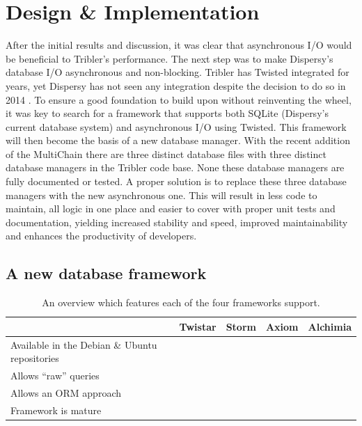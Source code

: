 \chapter{Design \& Implementation}

After the initial results and discussion, it was clear that asynchronous I/O would be beneficial to Tribler's performance.
The next step was to make Dispersy's database I/O asynchronous and non-blocking.
Tribler has Twisted integrated for years, yet Dispersy has not seen any integration despite the decision to do so in 2014 \cite{pouwelse2013consider}.
To ensure a good foundation to build upon without reinventing the wheel, it was key to search for a framework that supports both SQLite (Dispersy's current database system) and asynchronous I/O using Twisted.
This framework will then become the basis of a new database manager.
With the recent addition of the MultiChain there are three distinct database files with three distinct database managers in the Tribler code base.
None these database managers are fully documented or tested.
A proper solution is to replace these three database managers with the new asynchronous one.
This will result in less code to maintain, all logic in one place and easier to cover with proper unit tests and documentation, yielding increased stability and speed, improved maintainability and enhances the productivity of developers.

\section{A new database framework}

\begin{table}[]
	\centering
	\caption{An overview which features each of the four frameworks support.}
	\label{table:database_frameworks_comparison}
	\begin{tabular}{l|c|c|c|c|}
		\cline{2-5}
		& \textbf{Twistar} & \textbf{Storm} & \textbf{Axiom} & \textbf{Alchimia} \\ \hline
	\multicolumn{1}{|p{4cm}|}{Available in the Debian \& Ubuntu repositories} 	& \xmark & \cmark & \cmark & \xmark \\ \hline
	\multicolumn{1}{|l|}{Allows \enquote{raw} queries} 							& \cmark & \cmark & \cmark & \cmark \\ \hline
	\multicolumn{1}{|l|}{Allows an ORM approach} 								& \cmark & \cmark & \cmark & \xmark \\ \hline
	\multicolumn{1}{|l|}{Framework is mature} 									& \cmark & \cmark & \cmark & \xmark \\ \hline
	\end{tabular}
\end{table}

